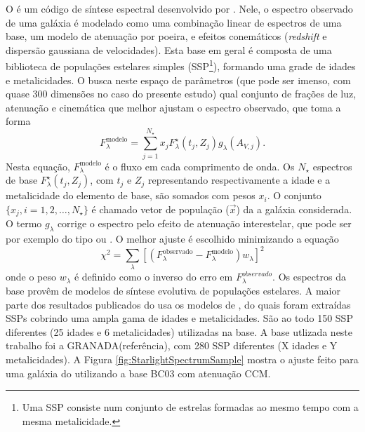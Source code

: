 O \starlight é um código de síntese espectral desenvolvido por
\citet{CidFernandes2005}. Nele, o espectro observado de uma galáxia é modelado
como uma combinação linear de espectros de uma base, um modelo de atenuação por
poeira, e efeitos conemáticos ({\em redshift} e dispersão gaussiana de
velocidades). Esta base em geral é composta de uma biblioteca de populações
estelares simples (SSP\footnote{Uma SSP consiste num conjunto de estrelas
formadas ao mesmo tempo com a mesma metalicidade.}), formando uma grade de
idades e metalicidades. O \starlight busca neste espaço de parâmetros (que pode
ser imenso, com quase 300 dimensões no caso do presente estudo) qual conjunto de
frações de luz, atenuação e cinemática que melhor ajustam o espectro observado,
que toma a forma
\begin{equation*}
F^{\mathrm{modelo}}_\lambda = \sum_{j=1}^{N_\star} x_j F^\star_\lambda(t_j,Z_j)
g_\lambda(A_{V,j}).
\end{equation*}
Nesta equação, $F^{\mathrm{modelo}}_\lambda$ é o fluxo em cada comprimento de
onda. Os $N_\star$ espectros de base $F^\star_\lambda(t_j, Z_j)$, com $t_j$ e
$Z_j$ representando respectivamente a idade e a metalicidade do elemento de
base, são somados com pesos $x_i$. O conjunto $\{x_j, i=1,2,\ldots,N_\star\}$
é chamado vetor de população ($\vec{x}$) da a galáxia considerada. O
termo $g_\lambda$ corrige o espectro pelo efeito de atenuação interestelar, que
pode ser por exemplo do tipo \citep[CCM]{Cardelli1989} ou \citep[CAL]{Calzetti1994}.
O melhor ajuste é escolhido minimizando a equação
\begin{equation*}
\chi^2 = \sum_\lambda \left[(F^{\mathrm{observado}}_\lambda -
F^{\mathrm{modelo}}_\lambda) w_\lambda\right]^2
\end{equation*}
onde o peso $w_\lambda$ é definido como o inverso do erro em
$F_\lambda^{observado}$. Os espectros da base provêm de modelos de síntese
evolutiva de populações estelares. A maior parte dos resultados publicados do
\starlight usa os modelos de \citet[BC03]{Bruzual2003}, do quais foram extraídas
SSPs cobrindo uma ampla gama de idades e metalicidades. São ao todo 150 SSP
diferentes (25 idades e 6 metalicidades) utilizadas na base. A base utlizada
neste trabalho foi a GRANADA\fixme (referência), com 280 SSP diferentes (X
idades e Y metalicidades)\fixme. A Figura \ref{fig:StarlightSpectrumSample}
mostra o ajuste feito para uma galáxia do \SDSS utilizando a base BC03 com
atenuação CCM.

